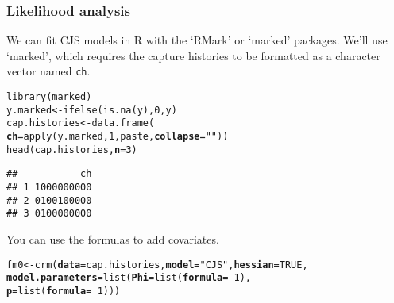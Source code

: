 \documentclass[color=usenames,dvipsnames]{beamer}\usepackage[]{graphicx}\usepackage[]{color}
\makeatletter
\newcommand{\hlnum}[1]{\textcolor[rgb]{0.69,0.494,0}{#1}}%
\newcommand{\hlstr}[1]{\textcolor[rgb]{0.749,0.012,0.012}{#1}}%
\newcommand{\hlopt}[1]{\textcolor[rgb]{0,0,0}{#1}}%
\newcommand{\hlstd}[1]{\textcolor[rgb]{0,0,0}{#1}}%
\newcommand{\hlkwb}[1]{\textcolor[rgb]{0,0.341,0.682}{#1}}%
\newcommand{\hlkwc}[1]{\textcolor[rgb]{0,0,0}{\textbf{#1}}}%
\newcommand{\hlkwd}[1]{\textcolor[rgb]{0.004,0.004,0.506}{#1}}%
\newenvironment{kframe}{%
 \def\at@end@of@kframe{}%
 \ifinner\ifhmode%
  \def\at@end@of@kframe{\end{minipage}}%
  \begin{minipage}{\columnwidth}%
 \fi\fi%
 \def\FrameCommand##1{\hskip\@totalleftmargin \hskip-\fboxsep
 \colorbox{shadecolor}{##1}\hskip-\fboxsep
     \hskip-\linewidth \hskip-\@totalleftmargin \hskip\columnwidth}%
 \MakeFramed {\advance\hsize-\width
   \@totalleftmargin\z@ \linewidth\hsize
   \@setminipage}}%
 {\par\unskip\endMakeFramed%
 \at@end@of@kframe}
\newenvironment{knitrout}{}{} %
\newcommand{\inr}[1]{\colorbox{inlinecolor}{\texttt{#1}}}
\makeatother
\begin{document}
\begin{frame}[fragile]
  \frametitle{Likelihood analysis}
  \small
  We can fit CJS models in R with the `RMark' or `marked'
  packages. We'll use `marked', which requires the capture histories
  to be formatted as a character vector named \inr{ch}. 
\begin{knitrout}\footnotesize
{}\color{fgcolor}\begin{kframe}
\begin{alltt}
\hlkwd{library}\hlstd{(marked)}
\hlstd{y.marked} \hlkwb{<-} \hlkwd{ifelse}\hlstd{(}\hlkwd{is.na}\hlstd{(y),} \hlnum{0}\hlstd{, y)}
\hlstd{cap.histories} \hlkwb{<-} \hlkwd{data.frame}\hlstd{(}
    \hlkwc{ch}\hlstd{=}\hlkwd{apply}\hlstd{(y.marked,} \hlnum{1}\hlstd{, paste,} \hlkwc{collapse}\hlstd{=}\hlstr{""}\hlstd{))}
\hlkwd{head}\hlstd{(cap.histories,} \hlkwc{n}\hlstd{=}\hlnum{3}\hlstd{)}
\end{alltt}
\begin{verbatim}
##           ch
## 1 1000000000
## 2 0100100000
## 3 0100000000
\end{verbatim}
\end{kframe}
\end{knitrout}
  \pause
  \vfill
  You can use the formulas to add covariates.
\begin{knitrout}\footnotesize
{}\color{fgcolor}\begin{kframe}
\begin{alltt}
\hlstd{fm0} \hlkwb{<-} \hlkwd{crm}\hlstd{(}\hlkwc{data}\hlstd{=cap.histories,} \hlkwc{model}\hlstd{=}\hlstr{"CJS"}\hlstd{,} \hlkwc{hessian}\hlstd{=}\hlnum{TRUE}\hlstd{,}
           \hlkwc{model.parameters}\hlstd{=}\hlkwd{list}\hlstd{(}\hlkwc{Phi}\hlstd{=}\hlkwd{list}\hlstd{(}\hlkwc{formula}\hlstd{=}\hlopt{~}\hlnum{1}\hlstd{),}
                                 \hlkwc{p}\hlstd{=}\hlkwd{list}\hlstd{(}\hlkwc{formula}\hlstd{=}\hlopt{~}\hlnum{1}\hlstd{)))}
\end{alltt}
\end{kframe}
\end{knitrout}
\end{frame}
\end{document}
